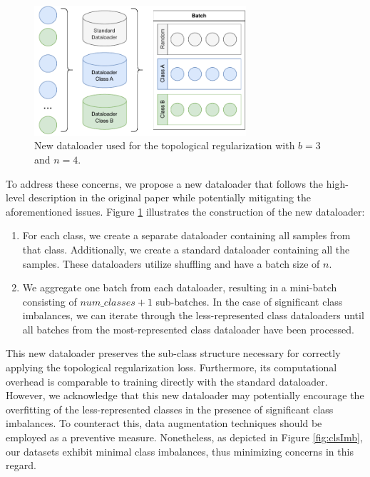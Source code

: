 \documentclass[../main.tex]{subfiles}
\begin{document}
\begin{figure}[!ht]
    \centering
    \includegraphics[width=0.7\textwidth]{figures/mt/hoferDataFix.pdf} 
    \caption{New dataloader used for the topological regularization with $b=3$ and $n=4$.}
    \label{fig:hoferDataFix}
\end{figure}


To address these concerns, we propose a new dataloader that follows the high-level description in the original paper while potentially mitigating the aforementioned issues. Figure \ref{fig:hoferDataFix} illustrates the construction of the new dataloader:
\begin{enumerate}
    \item For each class, we create a separate dataloader containing all samples from that class. Additionally, we create a standard dataloader containing all the samples. These dataloaders utilize shuffling and have a batch size of $n$.
    
    \item We aggregate one batch from each dataloader, resulting in a mini-batch consisting of $num\_classes + 1$ sub-batches. In the case of significant class imbalances, we can iterate through the less-represented class dataloaders until all batches from the most-represented class dataloader have been processed.
    
\end{enumerate}

This new dataloader preserves the sub-class structure necessary for correctly applying the topological regularization loss. Furthermore, its computational overhead is comparable to training directly with the standard dataloader. However, we acknowledge that this new dataloader may potentially encourage the overfitting of the less-represented classes in the presence of significant class imbalances. To counteract this, data augmentation techniques should be employed as a preventive measure. Nonetheless, as depicted in Figure \ref{fig:clsImb}, our datasets exhibit minimal class imbalances, thus minimizing concerns in this regard.
\end{document}

